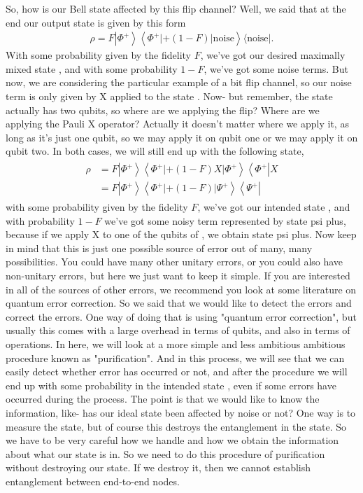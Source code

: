 So, how is our Bell state affected by this flip channel? Well, we said that at the end our output state is given by this form
\begin{align}
    \rho=F\left|\Phi^{+}\right\rangle\left\langle\Phi^{+}|+(1-F)| \text {noise}\right\rangle\langle\text{noise}|.
\end{align}
With some probability given by the fidelity $F$, we've got our desired maximally mixed state  \ket{\Phi^+}, and with some probability $1-F$, we've got some noise terms. But now, we are considering the particular example of a bit flip channel, so our noise term is only given by X applied to the state  \ket{\Phi^+}. Now- but remember, the state  \ket{\Phi^+} actually has two qubits, so where are we applying the flip? Where are we applying the Pauli X operator? Actually it doesn't matter where we apply it, as long as it's just one qubit, so we may apply it on qubit one or we may apply it on qubit two. In both cases, we will still end up with the following state,
\begin{align}
\begin{aligned}
\rho &=F\left|\Phi^{+}\right\rangle\left\langle\Phi^{+}|+(1-F) X| \Phi^{+}\right\rangle\left\langle\Phi^{+}\right| X \\
&=F\left|\Phi^{+}\right\rangle\left\langle\Phi^{+}|+(1-F)| \Psi^{+}\right\rangle\left\langle\Psi^{+}\right|
\end{aligned}
\end{align}
with some probability given by the fidelity $F$, we've got our intended state  \ket{\Phi^+}, and with probability $1-F$ we've got some noisy term represented by state psi plus, because if we apply X to one of the qubits of  \ket{\Phi^+}, we obtain state psi plus. Now keep in mind that this is just one possible source of error out of many, many possibilities. You could have many other unitary errors, or you could also have non-unitary errors, but here we just want to keep it simple. If you are interested in all of the sources of other errors, we recommend you look at some literature on quantum error correction. So we said that we would like to detect the errors and correct the errors. One way of doing that is using "quantum error correction", but usually this comes with a large overhead in terms of qubits, and also in terms of operations. In here, we will look at a more simple and less ambitious ambitious procedure known as "purification". And in this process, we will see that we can easily detect whether error has occurred or not, and after the procedure we will end up with some probability in the intended state  \ket{\Phi^+}, even if some errors have occurred during the process. The point is that we would like to know the information, like- has our ideal state been affected by noise or not? One way is to measure the state, but of course this destroys the entanglement in the state. So we have to be very careful how we handle and how we obtain the information about what our state is in. So we need to do this procedure of purification without destroying our state. If we destroy it, then we cannot establish entanglement between end-to-end nodes.

